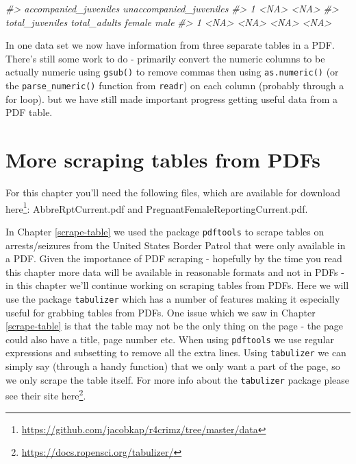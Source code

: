 \documentclass[
]{krantz}
\makeatletter
\newenvironment{Shaded}{\begin{snugshade}}{\end{snugshade}}
\newcommand{\CommentTok}[1]{\textcolor[rgb]{0.37,0.37,0.37}{\textit{#1}}}
\renewcommand{\href}[2]{#2\footnote{\url{#1}}}
\newenvironment{kframe}{%
\medskip{}
\setlength{\fboxsep}{.8em}
 \def\at@end@of@kframe{}%
 \ifinner\ifhmode%
  \def\at@end@of@kframe{\end{minipage}}%
  \begin{minipage}{\columnwidth}%
 \fi\fi%
 \def\FrameCommand##1{\hskip\@totalleftmargin \hskip-\fboxsep
 \colorbox{shadecolor}{##1}\hskip-\fboxsep
     \hskip-\linewidth \hskip-\@totalleftmargin \hskip\columnwidth}%
 \MakeFramed {\advance\hsize-\width
   \@totalleftmargin\z@ \linewidth\hsize
   \@setminipage}}%
 {\par\unskip\endMakeFramed%
 \at@end@of@kframe}
\renewenvironment{Shaded}{\begin{kframe}}{\end{kframe}}
\makeatother
\begin{document}
\begin{Shaded}
\begin{Highlighting}[]
\CommentTok{\#\textgreater{}   accompanied\_juveniles unaccompanied\_juveniles}
\CommentTok{\#\textgreater{} 1                  \textless{}NA\textgreater{}                    \textless{}NA\textgreater{}}
\CommentTok{\#\textgreater{}   total\_juveniles total\_adults female male}
\CommentTok{\#\textgreater{} 1            \textless{}NA\textgreater{}         \textless{}NA\textgreater{}   \textless{}NA\textgreater{} \textless{}NA\textgreater{}}
\end{Highlighting}
\end{Shaded}

In one data set we now have information from three separate tables in a PDF. There's still some work to do - primarily convert the numeric columns to be actually numeric using \texttt{gsub()} to remove commas then using \texttt{as.numeric()} (or the \texttt{parse\_numeric()} function from \texttt{readr}) on each column (probably through a for loop). but we have still made important progress getting useful data from a PDF table.

\hypertarget{scrape-table2}{%
\chapter{More scraping tables from PDFs}\label{scrape-table2}}

For this chapter you'll need the following files, which are available for download \href{https://github.com/jacobkap/r4crimz/tree/master/data}{here}: AbbreRptCurrent.pdf and PregnantFemaleReportingCurrent.pdf.

In Chapter \ref{scrape-table} we used the package \texttt{pdftools} to scrape tables on arrests/seizures from the United States Border Patrol that were only available in a PDF. Given the importance of PDF scraping - hopefully by the time you read this chapter more data will be available in reasonable formats and not in PDFs - in this chapter we'll continue working on scraping tables from PDFs. Here we will use the package \texttt{tabulizer} which has a number of features making it especially useful for grabbing tables from PDFs. One issue which we saw in Chapter \ref{scrape-table} is that the table may not be the only thing on the page - the page could also have a title, page number etc. When using \texttt{pdftools} we use regular expressions and subsetting to remove all the extra lines. Using \texttt{tabulizer} we can simply say (through a handy function) that we only want a part of the page, so we only scrape the table itself. For more info about the \texttt{tabulizer} package please see their site \href{https://docs.ropensci.org/tabulizer/}{here}.
\end{document}
